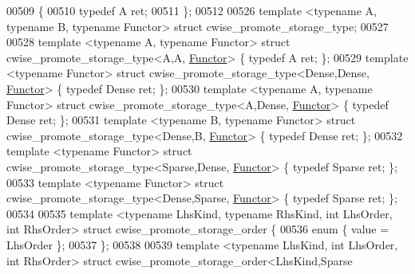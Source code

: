 \begin{DoxyCode}
{00509 \{
00510   \textcolor{keyword}{typedef} A ret;
00511 \};
00512 
00526 \textcolor{keyword}{template} <\textcolor{keyword}{typename} A, \textcolor{keyword}{typename} B, \textcolor{keyword}{typename} Functor> \textcolor{keyword}{struct }cwise\_promote\_storage\_type;
00527 
00528 \textcolor{keyword}{template} <\textcolor{keyword}{typename} A, \textcolor{keyword}{typename} Functor>                   \textcolor{keyword}{struct }cwise\_promote\_storage\_type<A,A,
      \hyperlink{struct_functor}{Functor}>                                      \{ \textcolor{keyword}{typedef} A      ret; \};
00529 \textcolor{keyword}{template} <\textcolor{keyword}{typename} Functor>                               \textcolor{keyword}{struct }cwise\_promote\_storage\_type<Dense,Dense,
      \hyperlink{struct_functor}{Functor}>                              \{ \textcolor{keyword}{typedef} Dense  ret; \};
00530 \textcolor{keyword}{template} <\textcolor{keyword}{typename} A, \textcolor{keyword}{typename} Functor>                   \textcolor{keyword}{struct }cwise\_promote\_storage\_type<A,Dense,
      \hyperlink{struct_functor}{Functor}>                                  \{ \textcolor{keyword}{typedef} Dense  ret; \};
00531 \textcolor{keyword}{template} <\textcolor{keyword}{typename} B, \textcolor{keyword}{typename} Functor>                   \textcolor{keyword}{struct }cwise\_promote\_storage\_type<Dense,B,
      \hyperlink{struct_functor}{Functor}>                                  \{ \textcolor{keyword}{typedef} Dense  ret; \};
00532 \textcolor{keyword}{template} <\textcolor{keyword}{typename} Functor>                               \textcolor{keyword}{struct }cwise\_promote\_storage\_type<Sparse,Dense,
      \hyperlink{struct_functor}{Functor}>                             \{ \textcolor{keyword}{typedef} Sparse ret; \};
00533 \textcolor{keyword}{template} <\textcolor{keyword}{typename} Functor>                               \textcolor{keyword}{struct }cwise\_promote\_storage\_type<Dense,Sparse,
      \hyperlink{struct_functor}{Functor}>                             \{ \textcolor{keyword}{typedef} Sparse ret; \};
00534 
00535 \textcolor{keyword}{template} <\textcolor{keyword}{typename} LhsKind, \textcolor{keyword}{typename} RhsKind, \textcolor{keywordtype}{int} LhsOrder, \textcolor{keywordtype}{int} RhsOrder> \textcolor{keyword}{struct }
      cwise\_promote\_storage\_order \{
00536   \textcolor{keyword}{enum} \{ value = LhsOrder \};
00537 \};
00538 
00539 \textcolor{keyword}{template} <\textcolor{keyword}{typename} LhsKind, \textcolor{keywordtype}{int} LhsOrder, \textcolor{keywordtype}{int} RhsOrder>   \textcolor{keyword}{struct }cwise\_promote\_storage\_order<LhsKind,Sparse
}
\end{DoxyCode}
